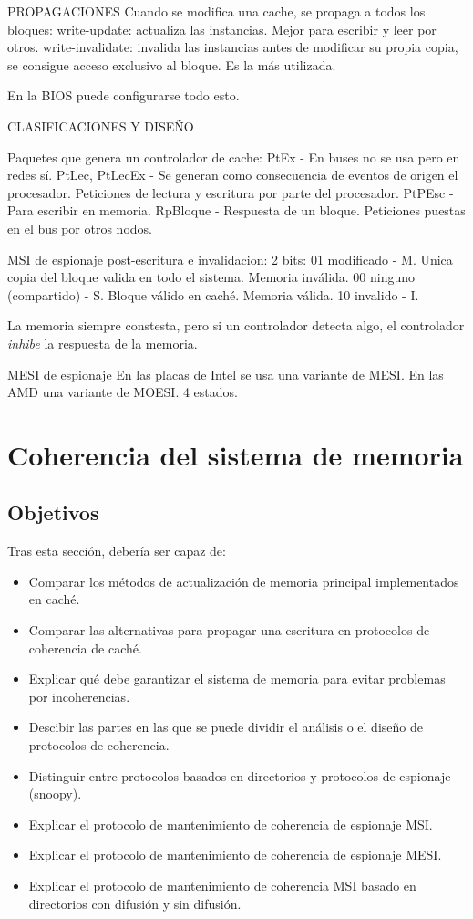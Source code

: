 PROPAGACIONES
Cuando se modifica una cache, se propaga a todos los bloques:
write-update: actualiza las instancias. Mejor para escribir y leer por otros.
write-invalidate: invalida las instancias antes de modificar su propia copia, se consigue acceso exclusivo al bloque. Es la más utilizada.

En la BIOS puede configurarse todo esto.

CLASIFICACIONES Y DISEÑO

Paquetes que genera un controlador de cache:
PtEx - En buses no se usa pero en redes sí.
PtLec, PtLecEx - Se generan como consecuencia de eventos de origen el procesador. Peticiones de lectura y escritura por parte del procesador.
PtPEsc - Para escribir en memoria.
RpBloque - Respuesta de un bloque. Peticiones puestas en el bus por otros nodos.

MSI de espionaje
post-escritura e invalidacion: 2 bits:
01 modificado - M. Unica copia del bloque valida en todo el sistema. Memoria inválida.
00 ninguno (compartido) - S. Bloque válido en caché. Memoria válida.
10 invalido - I. 

La memoria siempre constesta, pero si un controlador detecta algo, el controlador \emph{inhibe} la respuesta de la memoria.

MESI de espionaje
En las placas de Intel se usa una variante de MESI. En las AMD una variante de MOESI.
4 estados.




\section{Coherencia del sistema de memoria}
\subsection{Objetivos}
Tras esta sección, debería ser capaz de:
\begin{itemize}
    \item Comparar los métodos de actualización de memoria principal implementados en caché.
    \item Comparar las alternativas para propagar una escritura en protocolos de coherencia de caché.
    \item Explicar qué debe garantizar el sistema de memoria para evitar problemas por incoherencias.
    \item Descibir las partes en las que se puede dividir el análisis o el diseño de protocolos de coherencia.
    \item Distinguir entre protocolos basados en directorios y protocolos de espionaje (snoopy).
    \item Explicar el protocolo de mantenimiento de coherencia de espionaje MSI.
    \item Explicar el protocolo de mantenimiento de coherencia de espionaje MESI.
    \item Explicar el protocolo de mantenimiento de coherencia MSI basado en directorios con difusión y sin difusión.
\end{itemize}

